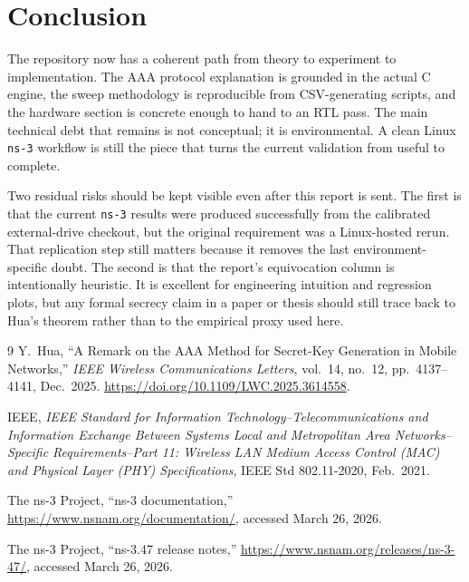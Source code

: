 \documentclass[11pt]{article}
\begin{document}
\section{Conclusion}
The repository now has a coherent path from theory to experiment to implementation. The AAA protocol explanation is grounded in the actual C engine, the sweep methodology is reproducible from CSV-generating scripts, and the hardware section is concrete enough to hand to an RTL pass. The main technical debt that remains is not conceptual; it is environmental. A clean Linux \texttt{ns-3} workflow is still the piece that turns the current validation from useful to complete.

Two residual risks should be kept visible even after this report is sent. The first is that the current \texttt{ns-3} results were produced successfully from the calibrated external-drive checkout, but the original requirement was a Linux-hosted rerun. That replication step still matters because it removes the last environment-specific doubt. The second is that the report's equivocation column is intentionally heuristic. It is excellent for engineering intuition and regression plots, but any formal secrecy claim in a paper or thesis should still trace back to Hua's theorem rather than to the empirical proxy used here.

\begin{thebibliography}{9}
Y.~Hua, ``A Remark on the AAA Method for Secret-Key Generation in Mobile Networks,'' \emph{IEEE Wireless Communications Letters}, vol.~14, no.~12, pp.~4137--4141, Dec.~2025. \url{https://doi.org/10.1109/LWC.2025.3614558}.

IEEE, \emph{IEEE Standard for Information Technology--Telecommunications and Information Exchange Between Systems Local and Metropolitan Area Networks--Specific Requirements--Part 11: Wireless LAN Medium Access Control (MAC) and Physical Layer (PHY) Specifications}, IEEE Std 802.11-2020, Feb.~2021.

The ns-3 Project, ``ns-3 documentation,'' \url{https://www.nsnam.org/documentation/}, accessed March 26, 2026.

The ns-3 Project, ``ns-3.47 release notes,'' \url{https://www.nsnam.org/releases/ns-3-47/}, accessed March 26, 2026.
\end{thebibliography}
\end{document}
